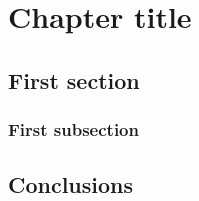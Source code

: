 
\chapter{Chapter title}\label{ch:name} \pagestyle{mainmatter}

\chapterprecishere{
}
\chapterprecistoc{} %



\section{First section}\label{sec:name-first}


\subsection{First subsection}\label{sec:name-first-sub}

\section{Conclusions}\label{sec:name-conclusions}
